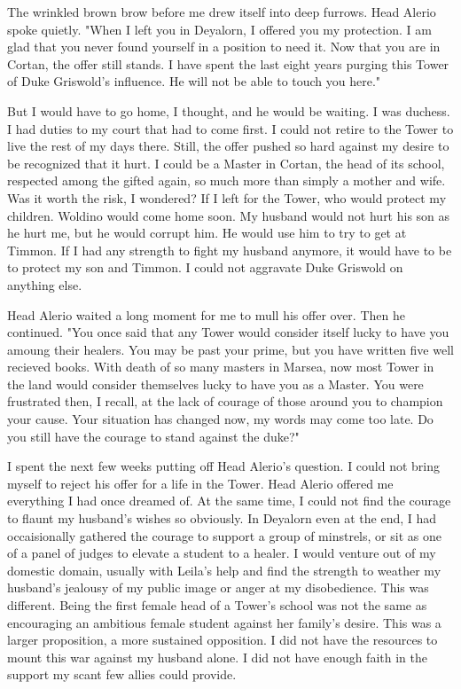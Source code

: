 \documentclass{article}
\begin{document}
The wrinkled brown brow before me drew itself into deep furrows. Head Alerio spoke quietly. "When I left you in Deyalorn, I offered you my protection. I am glad that you never found yourself in a position to need it. Now that you are in Cortan, the offer still stands. I have spent the last eight years purging this Tower of Duke Griswold's influence. He will not be able to touch you here."

But I would have to go home, I thought, and he would be waiting. I was duchess. I had duties to my court that had to come first. I could not retire to the Tower to live the rest of my days there. Still, the offer pushed so hard against my desire to be recognized that it hurt. I could be a Master in Cortan, the head of its school, respected among the gifted again, so much more than simply a mother and wife. Was it worth the risk, I wondered? If I left for the Tower, who would protect my children. Woldino would come home soon. My husband would not hurt his son as he hurt me, but he would corrupt him. He would use him to try to get at Timmon. If I had any strength to fight my husband anymore, it would have to be to protect my son and Timmon. I could not aggravate Duke Griswold on anything else.

Head Alerio waited a long moment for me to mull his offer over. Then he continued. "You once said that any Tower would consider itself lucky to have you amoung their healers. You may be past your prime, but you have written five well recieved books. With death of so many masters in Marsea, now most Tower in the land would consider themselves lucky to have you as a Master. You were frustrated then, I recall, at the lack of courage of those around you to champion your cause. Your situation has changed now, my words may come too late. Do you still have the courage to stand against the duke?"

\vspace{.5cm}

I spent the next few weeks putting off Head Alerio's question. I could not bring myself to reject his offer for a life in the Tower. Head Alerio offered me everything I had once dreamed of. At the same time, I could not find the courage to flaunt my husband's wishes so obviously. In Deyalorn even at the end, I had occaisionally gathered the courage to support a group of minstrels, or sit as one of a panel of judges to elevate a student to a healer. I would venture out of my domestic domain, usually with Leila's help and find the strength to weather my husband's jealousy of my public image or anger at my disobedience. This was different. Being the first female head of a Tower's school was not the same as encouraging an ambitious female student against her family's desire. This was a larger proposition, a more sustained opposition. I did not have the resources to mount this war against my husband alone. I did not have enough faith in the support my scant few allies could provide. 
\end{document}
